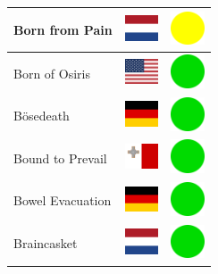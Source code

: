 \documentclass[12pt, a4paper, twoside]{report}
\begin{document}
\begin{center}
\begin{longtable}{|p{5cm}|p{2cm}|p{2cm}|}
 Born from Pain                                             & \includegraphics[width=1cm]{../img/flags/nl} &   \includegraphics[width=1cm]{../likes/m} \\ \hline
 Born of Osiris                                             & \includegraphics[width=1cm]{../img/flags/us} &   \includegraphics[width=1cm]{../likes/y} \\ \hline
 Bösedeath                                                  & \includegraphics[width=1cm]{../img/flags/de} &   \includegraphics[width=1cm]{../likes/y} \\ \hline
 Bound to Prevail                                           & \includegraphics[width=1cm]{../img/flags/mt} &   \includegraphics[width=1cm]{../likes/y} \\ \hline
 Bowel Evacuation                                           & \includegraphics[width=1cm]{../img/flags/de} &   \includegraphics[width=1cm]{../likes/y} \\ \hline
 Braincasket                                                & \includegraphics[width=1cm]{../img/flags/nl} &   \includegraphics[width=1cm]{../likes/y} \\ \hline

\end{longtable}
\end{center}
\end{document}
